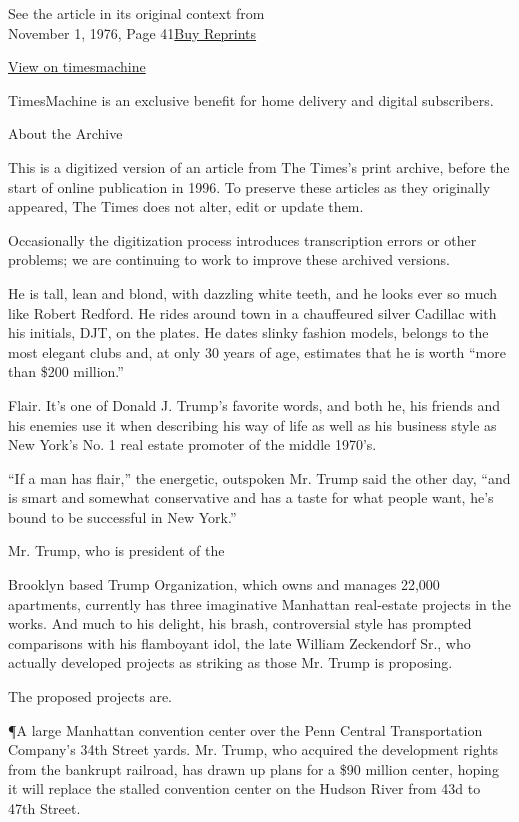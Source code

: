 See the article in its original context from\\
November 1, 1976, Page
41\href{https://store.nytimes3xbfgragh.onion/collections/new-york-times-page-reprints?utm_source=nytimes\&utm_medium=article-page\&utm_campaign=reprints}{Buy
Reprints}

\href{http://timesmachine.nytimes3xbfgragh.onion/timesmachine/1976/11/01/75642708.html}{View
on timesmachine}

TimesMachine is an exclusive benefit for home delivery and digital
subscribers.

About the Archive

This is a digitized version of an article from The Times's print
archive, before the start of online publication in 1996. To preserve
these articles as they originally appeared, The Times does not alter,
edit or update them.

Occasionally the digitization process introduces transcription errors or
other problems; we are continuing to work to improve these archived
versions.

He is tall, lean and blond, with dazzling white teeth, and he looks ever
so much like Robert Redford. He rides around town in a chauffeured
silver Cadillac with his initials, DJT, on the plates. He dates slinky
fashion models, belongs to the most elegant clubs and, at only 30 years
of age, estimates that he is worth ``more than \$200 million.''

Flair. It's one of Donald J. Trump's favorite words, and both he, his
friends and his enemies use it when describing his way of life as well
as his business style as New York's No. 1 real estate promoter of the
middle 1970's.

``If a man has flair,'' the energetic, outspoken Mr. Trump said the
other day, ``and is smart and somewhat conservative and has a taste for
what people want, he's bound to be successful in New York.''

Mr. Trump, who is president of the

Brooklyn based Trump Organization, which owns and manages 22,000
apartments, currently has three imaginative Manhattan real‐estate
projects in the works. And much to his delight, his brash, controversial
style has prompted comparisons with his flamboyant idol, the late
William Zeckendorf Sr., who actually developed projects as striking as
those Mr. Trump is proposing.

The proposed projects are.

¶A large Manhattan convention center over the Penn Central
Transportation Company's 34th Street yards. Mr. Trump, who acquired the
development rights from the bankrupt railroad, has drawn up plans for a
\$90 million center, hoping it will replace the stalled convention
center on the Hudson River from 43d to 47th Street.

